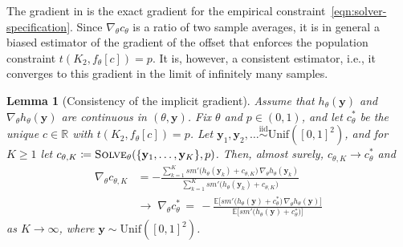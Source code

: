 \documentclass[11pt]{article}
\theoremstyle{plain}
\newtheorem{lemma}{Lemma}[section]
\theoremstyle{definition}
\theoremstyle{remark}
\newcommand*{\R}{\mathbb{R}}
\begin{document}
The gradient in  is the exact gradient for the empirical constraint~\eqref{eqn:solver-specification}. Since $\nabla_\theta c_\theta$ is a ratio of two sample averages, it is in general a biased estimator of the gradient of the offset that enforces the population constraint $t(K_2, f_\theta[c]) = p$. It is, however, a consistent estimator, i.e., it converges to this gradient in the limit of infinitely many samples.

\begin{lemma}[Consistency of the implicit gradient]\label{lem:consistency}
Assume that $h_\theta(\mathbf{y})$ and $\nabla_\theta h_\theta(\mathbf{y})$ are continuous in $(\theta, \mathbf{y})$. Fix $\theta$ and $p \in (0,1)$, and let $c^*_\theta$ be the unique $c \in \R$ with $t(K_2, f_\theta[c]) = p$. Let $\mathbf{y}_1, \mathbf{y}_2, \ldots \stackrel{\mathrm{iid}}{\sim} \mathrm{Unif}([0,1]^2)$, and for $K \ge 1$ let $c_{\theta,K} \coloneqq \textnormal{\textsc{Solve}}_\theta(\{\mathbf{y}_1, \ldots, \mathbf{y}_K\}, p)$. Then, almost surely, $c_{\theta,K} \to c^*_\theta$ and
\begin{align*}
\nabla_\theta c_{\theta,K}
&= -\frac{\sum_{k=1}^{K} \mathit{sm}'\bigl(h_\theta(\mathbf{y}_k) + c_{\theta,K}\bigr)\, \nabla_\theta h_\theta(\mathbf{y}_k)}{\sum_{k=1}^{K} \mathit{sm}'\bigl(h_\theta(\mathbf{y}_k) + c_{\theta,K}\bigr)}
\\
&\longrightarrow\;
\nabla_\theta c^*_\theta
\,=\, -\frac{\mathbb{E}\bigl[\mathit{sm}'\bigl(h_\theta(\mathbf{y}) + c^*_\theta\bigr)\, \nabla_\theta h_\theta(\mathbf{y})\bigr]}{\mathbb{E}\bigl[\mathit{sm}'\bigl(h_\theta(\mathbf{y}) + c^*_\theta\bigr)\bigr]}
\end{align*}
as $K \to \infty$, where $\mathbf{y} \sim \mathrm{Unif}([0,1]^2)$.
\end{lemma}
\end{document}
